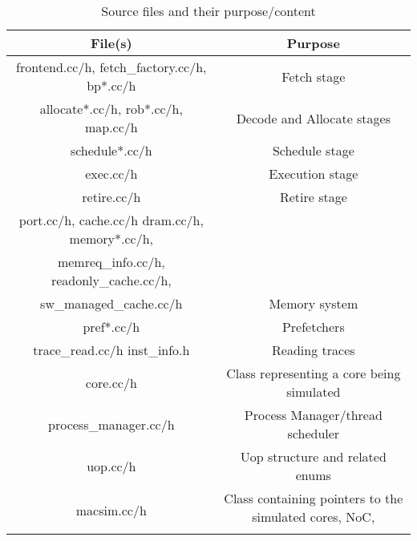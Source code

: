 \begin{table}[htb]
\begin{footnotesize}
\begin{center}
\caption{Source files and their purpose/content}
\label{table:file_list}
\begin{tabular}{|c||c|}
\hline 
File(s)                                                      & Purpose                            \\ \hline
frontend.cc/h, fetch\_factory.cc/h, bp*.cc/h                 & Fetch stage                        \\ \hline 
allocate*.cc/h, rob*.cc/h, map.cc/h                          & Decode and Allocate stages         \\ \hline
schedule*.cc/h                                               & Schedule stage                     \\ \hline 
exec.cc/h                                                    & Execution stage                    \\ \hline 
retire.cc/h                                                  & Retire stage                       \\ \hline       
port.cc/h, cache.cc/h dram.cc/h, memory*.cc/h, \\ 
memreq\_info.cc/h, readonly\_cache.cc/h, \\ 
sw\_managed\_cache.cc/h                                      & Memory system                      \\ \hline 
pref*.cc/h                                                   & Prefetchers                        \\ \hline
trace\_read.cc/h inst\_info.h                                & Reading traces                     \\ \hline
core.cc/h                                                    & Class representing a core being simulated \\ \hline
process\_manager.cc/h                                        & Process Manager/thread scheduler   \\ \hline 
uop.cc/h                                                     & Uop structure and related enums    \\ \hline
\multirow{2}{*}{macsim.cc/h}                                 & Class containing pointers to the simulated cores, NoC, \\
                                                               memory system, knobs and other objects \\ \hline

\end{tabular}
\end{center}
\end{footnotesize}
\end{table}
